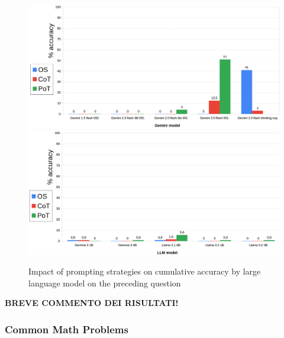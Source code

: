 \documentclass[12pt]{article}
\begin{document}
\begin{figure}[H]
    \centering
            \includegraphics[width=1\textwidth]{q105Gemini.png}
            \includegraphics[width=1\textwidth]{q105Other.png}
    \caption[Accuracy on Question 3 by LLM]{Impact of prompting strategies on cumulative accuracy by large language model on the preceding question}
    \end{figure} 
\textbf{BREVE COMMENTO DEI RISULTATI!}

\vspace{1cm}

\subsubsection{Common Math Problems} %
\end{document}
